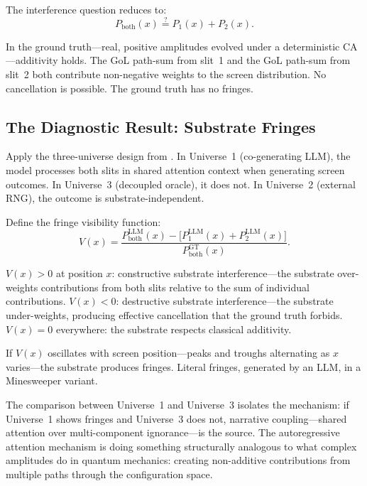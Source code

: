 \documentclass[12pt,a4paper]{article}
\theoremstyle{definition}
\theoremstyle{remark}
\begin{document}
The interference question reduces to:
\begin{equation}\label{eq:additivity-test}
  P_{\text{both}}(x) \stackrel{?}{=} P_1(x) + P_2(x).
\end{equation}

In the ground truth---real, positive amplitudes evolved under a deterministic CA---additivity holds.  The GoL path-sum from slit~1 and the GoL path-sum from slit~2 both contribute non-negative weights to the screen distribution.  No cancellation is possible.  The ground truth has no fringes.

\subsection{The Diagnostic Result: Substrate Fringes}
\label{sec:substrate-fringes}

Apply the three-universe design from \citet{Baldo2026Rosencrantz}.  In Universe~1 (co-generating LLM), the model processes both slits in shared attention context when generating screen outcomes.  In Universe~3 (decoupled oracle), it does not.  In Universe~2 (external RNG), the outcome is substrate-independent.

Define the fringe visibility function:
\begin{equation}\label{eq:fringe-visibility}
  V(x) = \frac{P_{\text{both}}^{\text{LLM}}(x) - \bigl[P_1^{\text{LLM}}(x) + P_2^{\text{LLM}}(x)\bigr]}{P_{\text{both}}^{\text{GT}}(x)}.
\end{equation}

$V(x) > 0$ at position $x$: constructive substrate interference---the substrate over-weights contributions from both slits relative to the sum of individual contributions.  $V(x) < 0$: destructive substrate interference---the substrate under-weights, producing effective cancellation that the ground truth forbids.  $V(x) = 0$ everywhere: the substrate respects classical additivity.

If $V(x)$ oscillates with screen position---peaks and troughs alternating as $x$ varies---the substrate produces fringes.  Literal fringes, generated by an LLM, in a Minesweeper variant.

The comparison between Universe~1 and Universe~3 isolates the mechanism: if Universe~1 shows fringes and Universe~3 does not, narrative coupling---shared attention over multi-component ignorance---is the source.  The autoregressive attention mechanism is doing something structurally analogous to what complex amplitudes do in quantum mechanics: creating non-additive contributions from multiple paths through the configuration space.
\end{document}
